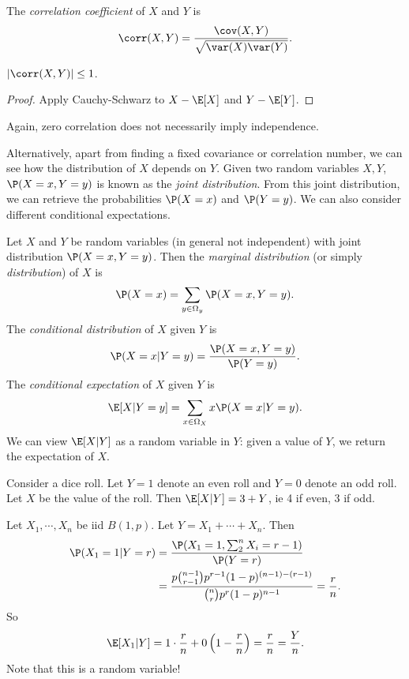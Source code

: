 \documentclass[a4paper]{article}
\begin{document}
\begin{defi}
  The \emph{correlation coefficient} of $X$ and $Y$ is
  \[
    \corr(X, Y) = \frac{\cov (X, Y)}{\sqrt{\var (X)\var (Y)}}.
  \]
\end{defi}

\begin{prop}
  $|\corr(X, Y)| \leq 1$.
\end{prop}

\begin{proof}
  Apply Cauchy-Schwarz to $X - \E[X]$ and $Y - \E[Y]$.
\end{proof}

Again, zero correlation does not necessarily imply independence.

Alternatively, apart from finding a fixed covariance or correlation number, we can see how the distribution of $X$ depends on $Y$. Given two random variables $X, Y$, $\P(X = x, Y = y)$ is known as the \emph{joint distribution}. From this joint distribution, we can retrieve the probabilities $\P(X = x)$ and $\P(Y = y)$. We can also consider different conditional expectations.

\begin{defi}
  Let $X$ and $Y$ be random variables (in general not independent) with joint distribution $\P(X = x, Y = y)$. Then the \emph{marginal distribution} (or simply \emph{distribution}) of $X$ is
  \[
    \P(X = x) = \sum_{y\in \Omega_y}\P(X = x, Y = y).
  \]
  The \emph{conditional distribution} of $X$ given $Y$ is
  \[
    \P(X = x|Y = y) = \frac{\P(X = x, Y = y)}{\P(Y = y)}.
  \]
  The \emph{conditional expectation} of $X$ given $Y$ is
  \[
    \E[X|Y = y] = \sum_{x\in \Omega_X}x\P(X = x|Y = y).
  \]
  We can view $\E[X|Y]$ as a random variable in $Y$: given a value of $Y$, we return the expectation of $X$.
\end{defi}

\begin{eg}
  Consider a dice roll. Let $Y = 1$ denote an even roll and $Y = 0$ denote an odd roll. Let $X$ be the value of the roll. Then $\E[X|Y] = 3 + Y$, ie 4 if even, 3 if odd.
\end{eg}

\begin{eg}
  Let $X_1, \cdots, X_n$ be iid $B(1, p)$. Let $Y = X_1 + \cdots + X_n$. Then
  \begin{align*}
    \P(X_1 = 1|Y = r) &= \frac{\P(X_1 = 1, \sum_{2}^n X_i = r - 1)}{\P(Y = r)}\\
    &= \frac{p\binom{n - 1}{r - 1}p^{r - 1}(1 - p)^{(n - 1) - (r - 1)}}{\binom{n}{r} p^r (1 - p)^{n - 1}} = \frac{r}{n}.
  \end{align*}
  So
  \[
    \E[X_1|Y] = 1 \cdot \frac{r}{n} + 0\left(1 - \frac{r}{n}\right) = \frac{r}{n} = \frac{Y}{n}.
  \]
  Note that this is a random variable!
\end{eg}
\end{document}
